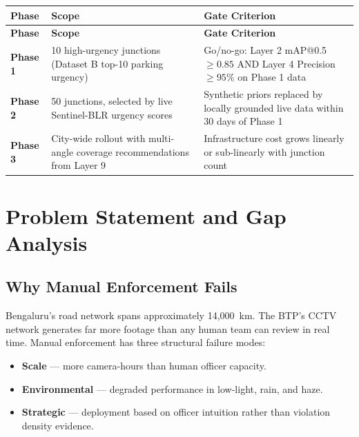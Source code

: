 \documentclass[11pt,a4paper]{article}
\begin{document}
\begin{longtable}{L{2cm} L{5.5cm} L{7cm}}
    \toprule
    \color{white}\textbf{Phase} & \color{white}\textbf{Scope} & \color{white}\textbf{Gate Criterion} \\
    \midrule
    \endfirsthead
    \toprule
    \color{white}\textbf{Phase} & \color{white}\textbf{Scope} & \color{white}\textbf{Gate Criterion} \\
    \midrule
    \endhead
    \bottomrule
    \endfoot

    \textbf{Phase 1} & 10 high-urgency junctions (Dataset B top-10 parking urgency) & Go/no-go: Layer 2 mAP@0.5 $\geq 0.85$ AND Layer 4 Precision $\geq 95\%$ on Phase 1 data \\
    \textbf{Phase 2} & 50 junctions, selected by live Sentinel-BLR urgency scores & Synthetic priors replaced by locally grounded live data within 30 days of Phase 1 \\
    \textbf{Phase 3} & City-wide rollout with multi-angle coverage recommendations from Layer 9 & Infrastructure cost grows linearly or sub-linearly with junction count \\
\end{longtable}

\section{Problem Statement and Gap Analysis}

\subsection*{Why Manual Enforcement Fails}

Bengaluru's road network spans approximately 14,000~km. The BTP's CCTV network generates far more footage than any human team can review in real time. Manual enforcement has three structural failure modes:

\begin{itemize}[leftmargin=1.8em, itemsep=0.2em]
    \item \textbf{Scale} — more camera-hours than human officer capacity.
    \item \textbf{Environmental} — degraded performance in low-light, rain, and haze.
    \item \textbf{Strategic} — deployment based on officer intuition rather than violation density evidence.
\end{itemize}
\end{document}
